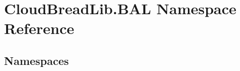 \hypertarget{a00425}{}\section{Cloud\+Bread\+Lib.\+B\+AL Namespace Reference}
\label{a00425}
\subsection*{Namespaces}
\begin{DoxyCompactItemize}
\end{DoxyCompactItemize}
